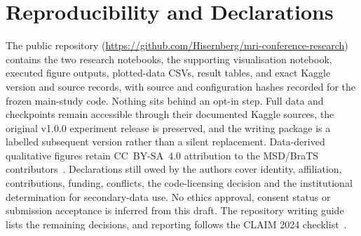 \section*{Reproducibility and Declarations}
 The public repository (\url{https://github.com/Hisernberg/mri-conference-research}) contains the two research notebooks, the supporting visualisation notebook, executed figure outputs, plotted-data CSVs, result tables, and exact Kaggle version and source records, with source and configuration hashes recorded for the frozen main-study code. Nothing sits behind an opt-in step. Full data and checkpoints remain accessible through their documented Kaggle sources, the original v1.0.0 experiment release is preserved, and the writing package is a labelled subsequent version rather than a silent replacement. Data-derived qualitative figures retain CC~BY-SA~4.0 attribution to the MSD/BraTS contributors~\cite{antonelli2022msd,menze2015brats}. Declarations still owed by the authors cover identity, affiliation, contributions, funding, conflicts, the code-licensing decision and the institutional determination for secondary-data use. No ethics approval, consent status or submission acceptance is inferred from this draft. The repository writing guide lists the remaining decisions, and reporting follows the CLAIM 2024 checklist~\cite{tejani2024claim}.
